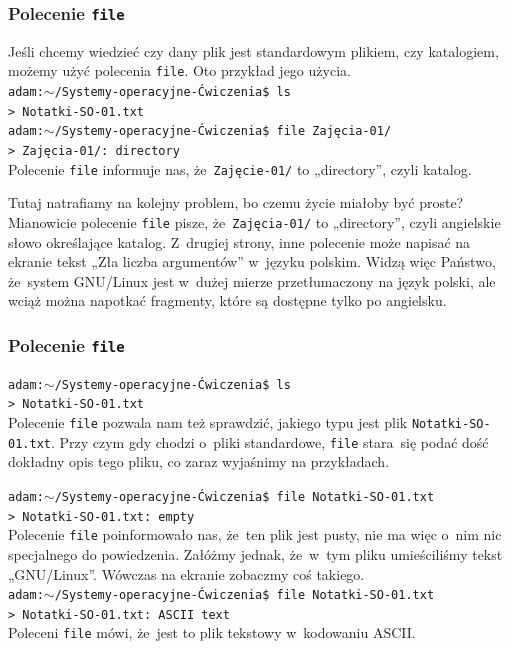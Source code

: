 \documentclass[10pt,t]{beamer}
\begin{document}
\begin{frame}
  \frametitle{Polecenie \texttt{file}}


  Jeśli chcemy wiedzieć czy dany plik jest standardowym plikiem, czy
  katalogiem, możemy użyć polecenia \texttt{file}. Oto przykład jego
  użycia. \\
  \texttt{adam:$\sim$/Systemy-operacyjne-Ćwiczenia\$ ls} \\
  \texttt{> Notatki-SO-01.txt} \quad
  \texttt{} \\
  \texttt{adam:$\sim$/Systemy-operacyjne-Ćwiczenia\$ file Zajęcia-01/} \\
  \texttt{> Zajęcia-01/: directory} \\
  Polecenie \texttt{file} informuje nas, że~\texttt{Zajęcie-01/} to
  „directory”, czyli katalog.

  Tutaj natrafiamy na kolejny problem, bo czemu życie miałoby być proste?
  Mianowicie polecenie \texttt{file} pisze, że~\texttt{Zajęcia-01/} to
  „directory”, czyli angielskie słowo określające katalog. Z~drugiej
  strony, inne polecenie może napisać na ekranie tekst „Zła liczba
  argumentów” w~języku polskim. Widzą więc Państwo, że~system GNU/Linux
  jest w~dużej mierze przetłumaczony na język polski, ale wciąż można
  napotkać fragmenty, które są dostępne tylko po angielsku.

\end{frame}





\begin{frame}
  \frametitle{Polecenie \texttt{file}}


  \texttt{adam:$\sim$/Systemy-operacyjne-Ćwiczenia\$ ls} \\
  \texttt{> Notatki-SO-01.txt} \quad
  \texttt{} \\
  Polecenie \texttt{file} pozwala nam też sprawdzić, jakiego typu
  jest plik \texttt{Notatki-SO-01.txt}. Przy czym gdy chodzi o~pliki
  standardowe, \texttt{file} stara~się podać dość dokładny opis tego pliku,
  co zaraz wyjaśnimy na przykładach.

  \texttt{adam:$\sim$/Systemy-operacyjne-Ćwiczenia\$ file Notatki-SO-01.txt} \\
  \texttt{> Notatki-SO-01.txt: empty} \\
  Polecenie \texttt{file} poinformowało nas, że~ten plik jest pusty, nie ma
  więc o~nim nic specjalnego do powiedzenia. Załóżmy jednak, że~w~tym pliku
  umieściliśmy tekst „GNU/Linux”. Wówczas na ekranie zobaczmy coś
  takiego. \\
  \texttt{adam:$\sim$/Systemy-operacyjne-Ćwiczenia\$ file Notatki-SO-01.txt} \\
  \texttt{> Notatki-SO-01.txt: ASCII text} \\
  Poleceni \texttt{file} mówi, że~jest to plik tekstowy w~kodowaniu ASCII.

\end{frame}
\end{document}
